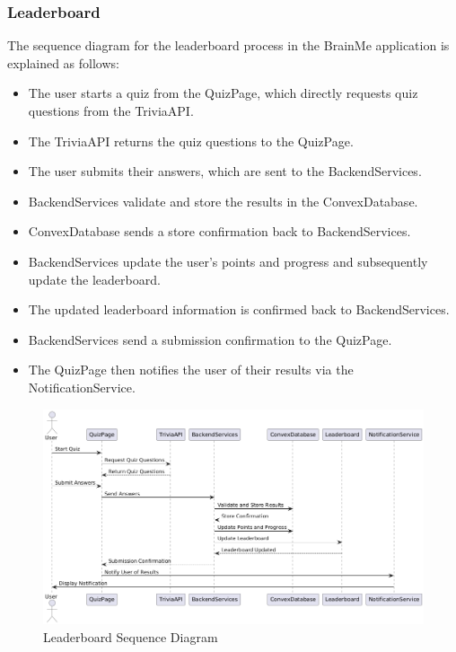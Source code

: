 \subsubsection{Leaderboard}

The sequence diagram for the leaderboard process in the BrainMe application is explained as follows:

\begin{itemize}
    \item The user starts a quiz from the QuizPage, which directly requests quiz questions from the TriviaAPI.
    \item The TriviaAPI returns the quiz questions to the QuizPage.
    \item The user submits their answers, which are sent to the BackendServices.
    \item BackendServices validate and store the results in the ConvexDatabase.
    \item ConvexDatabase sends a store confirmation back to BackendServices.
    \item BackendServices update the user's points and progress and subsequently update the leaderboard.
    \item The updated leaderboard information is confirmed back to BackendServices.
    \item BackendServices send a submission confirmation to the QuizPage.
    \item The QuizPage then notifies the user of their results via the NotificationService.
\end{itemize}


\begin{figure}[H]
    \centering
    \includegraphics[width=1\linewidth, height=0.5\textheight]{Sequence Diagrams/leaderboard.png}
    \caption{Leaderboard Sequence Diagram}
\end{figure}



